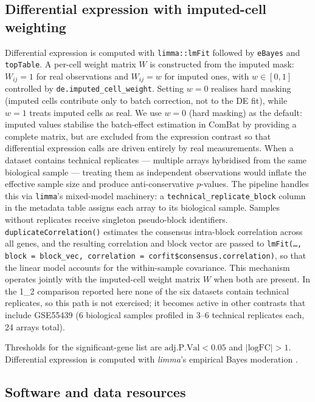 \documentclass[11pt,a4paper]{article}
\begin{document}
\subsection{Differential expression with imputed-cell
  weighting}

Differential expression is computed with \texttt{limma::lmFit}
followed by \texttt{eBayes} and \texttt{topTable}. A per-cell
weight matrix $W$ is constructed from the imputed mask:
$W_{ij} = 1$ for real observations and
$W_{ij} = w$ for imputed ones, with
$w \in [0, 1]$ controlled by \texttt{de.imputed\_cell\_weight}.
Setting $w = 0$ realises hard masking (imputed cells contribute
only to batch correction, not to the DE fit), while $w = 1$
treats imputed cells as real. We use $w = 0$ (hard masking) as
the default: imputed values stabilise the batch-effect
estimation in ComBat by providing a complete matrix, but are
excluded from the expression contrast so that differential
expression calls are driven entirely by real measurements.
When a dataset contains technical replicates --- multiple
arrays hybridised from the same biological sample --- treating
them as independent observations would inflate the effective
sample size and produce anti-conservative $p$-values. The
pipeline handles this via \texttt{limma}'s mixed-model
machinery: a \texttt{technical\_replicate\_block} column in the
metadata table assigns each array to its biological sample.
Samples without replicates receive singleton pseudo-block
identifiers. \texttt{duplicateCorrelation()} estimates the
consensus intra-block correlation across all genes, and the
resulting correlation and block vector are passed to
\texttt{lmFit(\ldots, block = block\_vec, correlation =
corfit\$consensus.correlation)}, so that the linear model
accounts for the within-sample covariance. This mechanism
operates jointly with the imputed-cell weight matrix $W$ when
both are present. In the 1\_2 comparison reported here none of
the six datasets contain technical replicates, so this path
is not exercised; it becomes active in other contrasts that
include GSE55439 (6 biological samples profiled in 3--6
technical replicates each, 24 arrays total).

Thresholds for the significant-gene list are
$\text{adj.P.Val} < 0.05$ and $|\text{logFC}| > 1$.
Differential expression is computed with \textit{limma}'s
empirical Bayes moderation \citep{Smyth2004, Ritchie2015}.

\subsection{Software and data resources}
\end{document}
